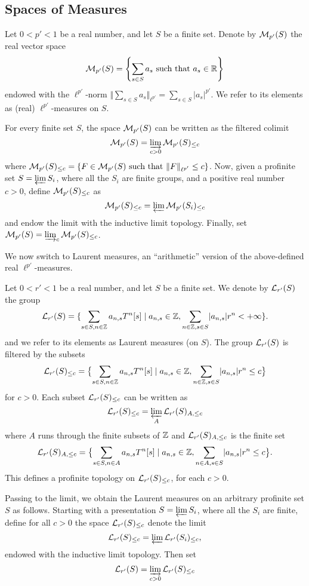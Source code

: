 \subsection{Spaces of Measures}

\begin{definition}
  \label{real-measures}
  \leanok
  Let $0 < p' < 1$ be a real number, and let $S$ be a finite set.
  Denote by $\mathcal M_{p'}(S)$ the real vector space
\[
\mathcal M_{p'}(S)=\left\{\sum_{s\in S}a_{s} \text{ such that } a_{s}\in \mathbb{R}\right\}
\]
endowed with the $\ell^{p'}$-norm $\Vert \sum_{s\in S}a_s\Vert_{\ell^{p'}}=\sum_{s\in S}\lvert a_s\rvert ^{p'}$. We refer to its elements as (real) $\ell^{p'}$-measures on $S$.
\end{definition}
For every finite set $S$, the space $\mathcal M_{p'}(S)$ can be written as the filtered colimit
\[
\mathcal M_{p'}(S)=\varinjlim_{c>0}\mathcal M_{p'}(S)_{\leq c}
\]
where $\mathcal M_{p'}(S)_{\leq c}=\left\{F \in \mathcal M_{p'}(S) \text{ such that } \Vert F \Vert_{\ell^{p'}}\leq c\right\}$. Now, given a profinite set $S=\varprojlim S_i$, where all the $S_i$ are finite groups, and a positive real number $c>0$, define $\mathcal M_{p'}(S)_{\leq c}$ as
\[
\mathcal M_{p'}(S)_{\leq c}=\varprojlim \mathcal M_{p'}(S_i)_{\leq c}
\]
and endow the limit with the inductive limit topology. Finally, set $\mathcal M_{p'}(S)=\varinjlim_{c}\mathcal M_{p'}(S)_{\leq c}$.

We now switch to Laurent measures, an ``arithmetic'' version of the above-defined real $\ell^{p'}$-measures.

\begin{definition}
  \label{laurent-measures-fin}
  \leanok
  Let $0 < r' < 1$ be a real number, and let $S$ be a finite set. We denote by $\mathcal L_{r'}(S)$ the group
\[
	\mathcal L_{r'}(S)=\{\sum_{s\in S,n\in \mathbb{Z}}a_{n,s}T^n[s] \mid a_{n,s}\in \mathbb{Z}, \sum_{n\in\mathbb{Z}, s\in S}\lvert a_{n,s}\rvert r^n
< + \infty\}.
\]
and we refer to its elements as Laurent measures (on $S$).
The group $\mathcal L_{r'}(S)$ is filtered by the subsets
\[
	\mathcal L_{r'}(S)_{\leq c}=\bigl\{\sum_{s\in S,n\in \mathbb{Z}}a_{n,s}T^n[s] \mid a_{n,s}\in \mathbb{Z}, \sum_{n\in\mathbb{Z}, s\in S}\lvert a_{n,s}\rvert r^n
\leq c\bigr\}
\]
for $c> 0$. Each subset $\mathcal L_{r'}(S)_{\leq c}$ can be written as
\[
\mathcal L_{r'}(S)_{\leq c}=\varprojlim_{A}\mathcal L_{r'}(S)_{A,\leq c}
\]
where $A$ runs through the finite subsets of $\mathbb{Z}$ and $\mathcal L_{r'}(S)_{A,\leq c}$ is the finite set
\[
	\mathcal L_{r'}(S)_{A,\leq c}=\bigl\{\sum_{s\in S,n\in A}a_{n,s}T^n[s] \mid a_{n,s}\in \mathbb{Z}, \sum_{n\in A, s\in S}\lvert a_{n,s}\rvert r^n\leq c\bigr\}.
\]
This defines a profinite topology on $\mathcal L_{r'}(S)_{\leq c}$, for each $c>0$.
\end{definition}
Passing to the limit, we obtain the Laurent measures on an arbitrary profinite set $S$ as follows. 
Starting with a presentation $S=\varprojlim S_i$, where all the $S_i$ are finite, define for all $c>0$ the space $\mathcal L_{r'}(S)_{\leq c}$ denote the limit
\[
\mathcal L_{r'}(S)_{\leq c}=\varprojlim\mathcal L_{r'}(S_i)_{\leq c},
\]
endowed with the inductive limit topology. Then set
\[
\mathcal L_{r'}(S)=\varinjlim_{c > 0}\mathcal L_{r'}(S)_{\leq c}
\]

